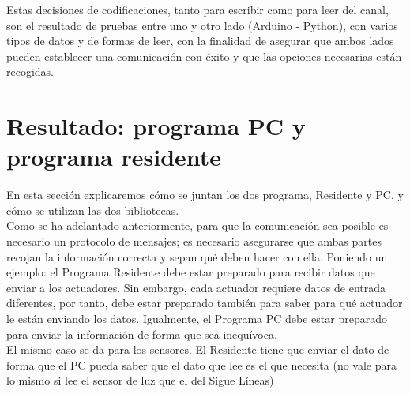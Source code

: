 	Estas decisiones de codificaciones, tanto para escribir como para leer del canal, son el resultado de pruebas entre uno y otro lado (Arduino - Python), con varios tipos de datos y de formas de leer, con la finalidad de asegurar que ambos lados pueden establecer una comunicación con éxito y que las opciones necesarias están recogidas.
\section{Resultado: programa PC y programa residente}\label{sec:resultado}
En esta sección explicaremos cómo se juntan los dos programa, Residente y PC, y cómo se utilizan las dos bibliotecas. \\
Como se ha adelantado anteriormente, para que la comunicación sea posible es necesario un protocolo de mensajes; es necesario asegurarse que ambas partes recojan la información correcta y sepan qué deben hacer con ella. Poniendo un ejemplo: el Programa Residente debe estar preparado para recibir datos que enviar a los actuadores. Sin embargo, cada actuador requiere datos de entrada diferentes, por tanto, debe estar preparado también para saber para qué actuador le están enviando los datos. Igualmente, el Programa PC debe estar preparado para enviar la información de forma que sea inequívoca. \\
El mismo caso se da para los sensores. El Residente tiene que enviar el dato de forma que el PC pueda saber que el dato que lee es el que necesita (no vale para lo mismo si lee el sensor de luz que el del Sigue Líneas) \\

